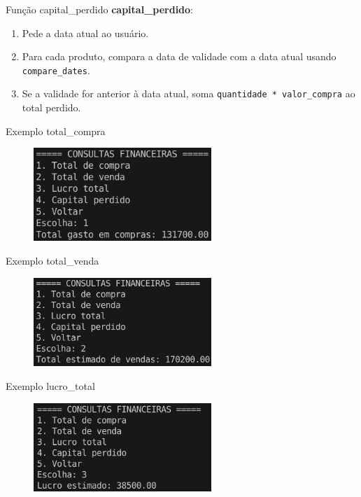 \documentclass{beamer}
\begin{document}
\begin{frame}{Função capital\_perdido}
    \textbf{capital\_perdido}:
    \begin{enumerate}
        \item Pede a data atual ao usuário.
        \item Para cada produto, compara a data de validade com a data atual usando \texttt{compare\_dates}.
        \item Se a validade for anterior à data atual, soma \texttt{quantidade * valor\_compra} ao total perdido.
    \end{enumerate}
\end{frame}

\begin{frame}{Exemplo total\_compra}
    \begin{figure}
        \centering
        \includegraphics[width=0.6\textwidth]{img/total-compra.png}
    \end{figure}   
\end{frame}

\begin{frame}{Exemplo total\_venda}
    \begin{figure}
        \centering
        \includegraphics[width=0.6\textwidth]{img/total-venda.png}
    \end{figure}
\end{frame}

\begin{frame}{Exemplo lucro\_total}
    \begin{figure}
        \centering
        \includegraphics[width=0.6\textwidth]{img/lucro.png}
    \end{figure}   
\end{frame}
\end{document}
